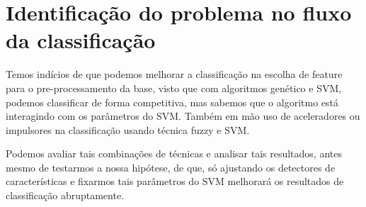 \documentclass[12pt,a4paper,letterpaper]{article}
\begin{document}
\section{Identificação do problema no fluxo da classificação}
Temos indícios de que podemos melhorar a classificação na escolha de feature
para o pre-processamento da base, visto que com algoritmos genético e SVM,
podemos classificar de forma competitiva, mas sabemos que o algoritmo está
interagindo com os parâmetros do SVM. Também em mão uso de aceleradores ou
impulsores na classificação usando técnica fuzzy e SVM.

Podemos avaliar tais combinações de técnicas e analisar tais resultados, antes
mesmo de testarmos a nossa hipótese, de que, só ajustando os detectores de
características e fixarmos tais parâmetros do SVM melhorará os resultados de
classificação abruptamente.

\pagebreak
\medskip
\printbibliography[
    heading=bibintoc,
    title={Referências Bibliográficas}
]
\end{document}
